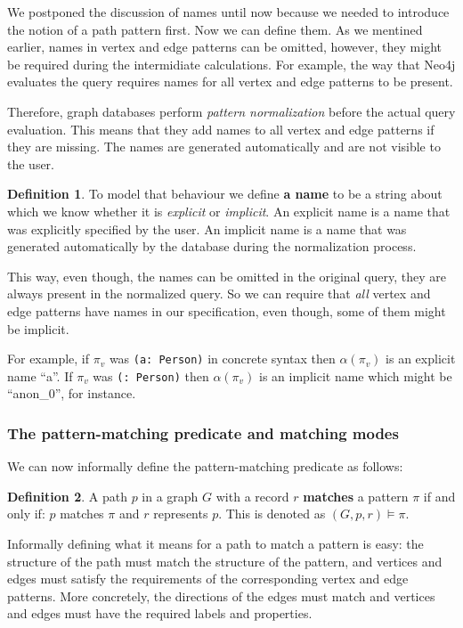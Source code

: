 \documentclass[14pt]{constructor-thesis}
\theoremstyle{definition}
\newtheorem{definition}{Definition}
\begin{document}
We postponed the discussion of names until now because we needed to introduce the notion of a path pattern first. Now we can define them. As we mentined earlier, names in vertex and edge patterns can be omitted, however, they might be required during the intermidiate calculations. For example, the way that Neo4j evaluates the query requires names for all vertex and edge patterns to be present. 

Therefore, graph databases perform \textit{pattern normalization} before the actual query evaluation. This means that they add names to all vertex and edge patterns if they are missing. The names are generated automatically and are not visible to the user.

\begin{definition}
  To model that behaviour we define \textbf{a name} to be a string about which we know whether it is \textit{explicit} or \textit{implicit}. An explicit name is a name that was explicitly specified by the user. An implicit name is a name that was generated automatically by the database during the normalization process.
\end{definition}

This way, even though, the names can be omitted in the original query, they are always present in the normalized query. So we can require that \textit{all} vertex and edge patterns have names in our specification, even though, some of them might be implicit.

For example, if $\pi_v$ was \texttt{(a: Person)} in concrete syntax then $\alpha(\pi_v)$ is an explicit name ``a''. If $\pi_v$ was \texttt{(: Person)} then $\alpha(\pi_v)$ is an implicit name which might be ``anon\_0'', for instance.

\subsubsection{The pattern-matching predicate and matching modes}

We can now informally define the pattern-matching predicate as follows:

\begin{definition}
   A path $p$ in a graph $G$ with a record $r$ \textbf{matches} a pattern $\pi$ if and only if: $p$ matches $\pi$ and $r$ represents $p$. This is denoted as $(G, p, r) \models \pi$.
\end{definition}

Informally defining what it means for a path to match a pattern is easy: the structure of the path must match the structure of the pattern, and vertices and edges must satisfy the requirements of the corresponding vertex and edge patterns. More concretely, the directions of the edges must match and vertices and edges must have the required labels and properties.
\end{document}

